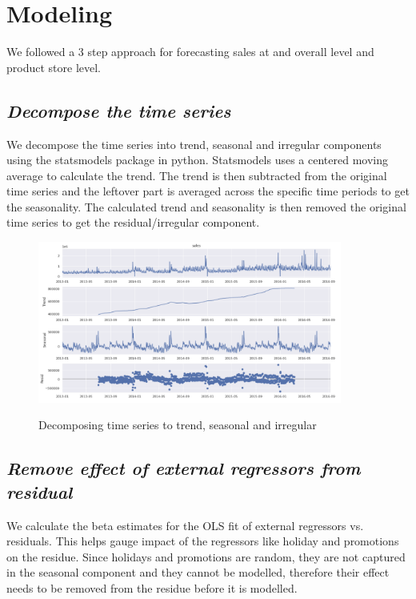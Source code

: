 \documentclass[12pt,a4paper]{cibb}
\begin{document}
\section{\bf Modeling}
\label{sec:MODELING}
We followed a 3 step approach for forecasting sales at and overall level and product store level.

\subsection{\bf \it Decompose the time series}
We decompose the time series into trend, seasonal and irregular components using the statsmodels package in python. Statsmodels uses a centered moving average to calculate the trend. The trend is then subtracted from the original time series and the leftover part is averaged across the specific time periods to get the seasonality. The calculated trend and seasonality is then removed the original time series to get the residual/irregular component.

\begin{figure}[h]
\vspace{3mm}
 \begin{center}
{\includegraphics[width=10cm]{stl_decomposition.png}}
\caption{Decomposing time series to trend, seasonal and irregular}
 \end{center}
 \vspace{-8mm}
\end{figure}

\subsection{\bf \it Remove effect of external regressors from residual}
We calculate the beta estimates for the OLS fit of external regressors vs. residuals. This helps gauge impact of the regressors like holiday and promotions on the residue. Since holidays and promotions are random, they are not captured in the seasonal component and they cannot be modelled, therefore their effect needs to be removed from the residue before it is modelled.  
\end{document}
